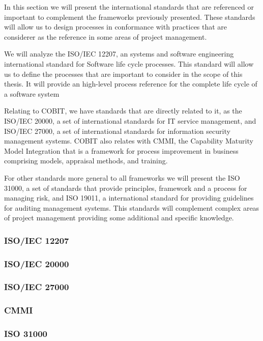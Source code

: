 In this section we will present the international standards that are referenced or important to complement the frameworks previously presented. These standards will allow us to design processes in conformance with practices that are considerer as the reference in some areas of project management.\par
We will analyze the ISO/IEC 12207, an systems and software engineering international standard for Software life cycle processes. This standard will allow us to define the processes that are important to consider in the scope of this thesis. It will provide an high-level process reference for the complete life cycle of a software system\par
Relating to COBIT, we have standards that are directly related to it, as the ISO/IEC 20000, a set of international standards for IT service management, and ISO/IEC 27000, a set of international standards for information security management systems. COBIT also relates with CMMI, the Capability Maturity Model Integration that is a framework for process improvement in business comprising models, appraisal methods, and training.\par
For other standards more general to all frameworks we will present the ISO 31000, a set of standards that provide principles, framework and a process for managing risk, and ISO 19011, a international standard for providing guidelines for auditing management systems. This standards will complement complex areas of project management providing some additional and specific knowledge.

\subsubsection{ISO/IEC 12207}  

\subsubsection{ISO/IEC 20000} 

\subsubsection{ISO/IEC 27000}

\subsubsection{CMMI}

\subsubsection{ISO 31000}

